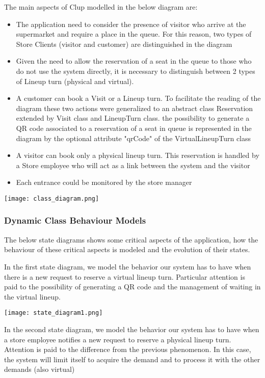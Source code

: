 The main aspects of Clup modelled in the below diagram are:
\begin{itemize}
    \item The application need to consider the presence of visitor who arrive at the supermarket and require a place in the queue. For this reason, two types of Store Clients (visitor and customer) are distinguished in the diagram
    \item Given the need to allow the reservation of a seat in the queue to those who do not use the system directly, it is necessary to distinguish between 2 types of Lineup turn (physical and virtual).
    \item A customer can book a Visit or a Lineup turn. To facilitate the reading of the diagram these two actions were generalized to an abstract class Reservation extended by Visit class and LineupTurn class. the possibility to generate a QR code associated to a reservation of a seat in queue is represented in the diagram by the optional attribute "qrCode" of the VirtualLineupTurn class
    \item A visitor can book only a physical lineup turn. This reservation is handled by a Store employee who will act as a link between the system and the visitor
    \item Each entrance could be monitored by the store manager
\end{itemize}
\texttt{[image: class\_diagram.png]}


\subsubsection{Dynamic Class Behaviour Models}
The below state diagrams shows some	critical aspects of	the	application, how the behaviour of these critical aspects is modeled and the evolution of their states.

\medskip
In the first state diagram, we model the behavior our system has to have when there is a new request to reserve a virtual lineup turn. Particular attention is paid to the possibility of generating a QR code and the management of waiting in the virtual lineup.

\medskip
\texttt{[image: state\_diagram1.png]}

\medskip
In the second state diagram, we model the behavior our system has to have when a store employee notifies a new request to reserve a physical lineup turn. Attention is paid to the difference from the previous phenomenon. In this case, the system will limit itself to acquire the demand and to process it with the other demands (also virtual)


